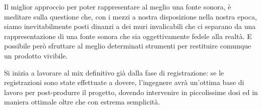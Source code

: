 \begin{compactitem}
	\item Il miglior approccio per poter rappresentare al meglio una fonte sonora, è meditare sulla questione che, con i mezzi a nostra disposizione nella nostra epoca, siamo inevitabilmente posti dinanzi a dei muri invalicabili che ci separano da una rappresentazione di una fonte sonora che sia oggettivamente fedele alla realtà.
	E possibile però sfruttare al meglio determinati strumenti per restituire comunque un prodotto vivibile.
	\item Si inizia a lavorare al mix definitivo già dalla fase di registrazione: se le registrazioni sono state effettuate a dovere, l'ingegnere avrà un'ottima base di lavoro per post-produrre il progetto, dovendo intervenire in piccolissime dosi ed in maniera ottimale oltre che con estrema semplicità.
\end{compactitem}
	
	
	
	
	\vfill\null
	
	\newpage %
	
	
	\vfill\null
	
	\raggedright
	


